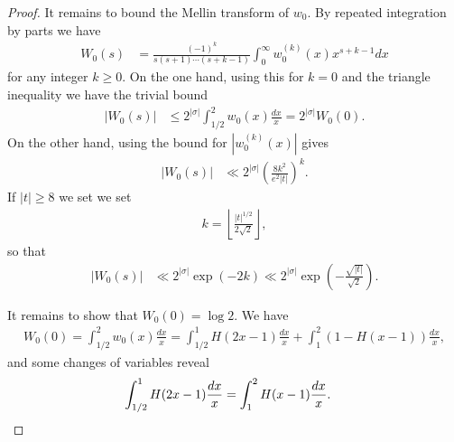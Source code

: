 \documentclass[12pt]{amsart}
\theoremstyle{plain}
\theoremstyle{definition}
\theoremstyle{remark}
\begin{document}
\begin{proof}
It remains to bound the Mellin transform of $w_0$. By repeated integration by parts we have
\begin{align*}
W_0(s) &= \frac{(-1)^k}{s(s+1) \cdots (s+k-1)}\int_0^\infty w_0^{(k)}(x) x^{s+k-1}dx
\end{align*}
for any integer $k\geq 0$. On the one hand, using this for $k=0$ and the triangle inequality we have the trivial bound
\begin{align*}
|W_0(s)|&\leq 2^{|\sigma|}\int_{1/2}^2 w_0(x) \frac{dx}{x} = 2^{|\sigma|}W_0(0).
\end{align*}
On the other hand, using the bound for $|w_0^{(k)}(x)|$ gives
\begin{align*}
|W_0(s)| &\ll 2^{|\sigma|}\left(\frac{8k^2}{e^2 |t|} \right)^k.
\end{align*}
If $|t|\geq 8$ we set
we set
\begin{align*}
k = \left\lfloor \frac{|t|^{1/2}}{2\sqrt{2}} \right\rfloor,
\end{align*}
so that
\begin{align*}
|W_0(s)| &\ll 2^{|\sigma|}\exp (-2k)\ll 2^{|\sigma|}\exp \left(-\frac{\sqrt{|t|}}{\sqrt{2}} \right).
\end{align*}

It remains to show that $W_0(0) = \log 2$. We have
\begin{align*}
W_0(0) = \int_{1/2}^2 w_0(x) \frac{dx}{x} = \int_{1/2}^1 H(2x-1) \frac{dx}{x} + \int_1^2 (1-H(x-1)) \frac{dx}{x},
\end{align*}
and some changes of variables reveal
\begin{align*}
\int_{1/2}^1 H(2x-1) \frac{dx}{x} &= \int_1^2 H(x-1) \frac{dx}{x}. \qedhere
\end{align*}
\end{proof}
\end{document}
